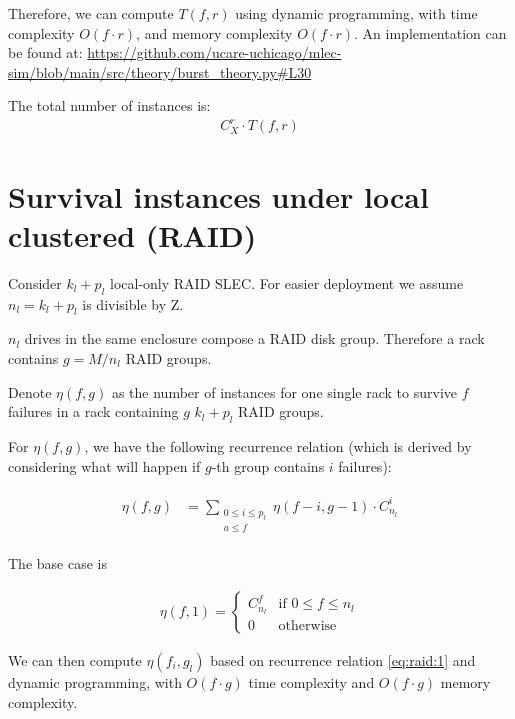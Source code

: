 \documentclass{article}
\begin{document}
Therefore, we can compute $T(f,r)$ using dynamic programming, with time complexity $O(f \cdot r)$, and memory complexity $O(f \cdot r)$. An implementation can be found at: \url{https://github.com/ucare-uchicago/mlec-sim/blob/main/src/theory/burst_theory.py#L30}

The total number of instances is:
\begin{eqnarray}
  C_{X}^{r} \cdot T(f,r)
\label{eq:total:final}
\end{eqnarray}

\section{Survival instances under local clustered (RAID)}\label{sec-raid}

Consider $k_l+p_l$ local-only RAID SLEC. For easier deployment we assume $n_l=k_l+p_l$ is divisible by Z.

$n_l$ drives in the same enclosure compose a RAID disk group. Therefore a rack contains $g = M/n_l$ RAID groups.

Denote $\eta(f, g)$ as the number of instances for one single rack to survive $f$ failures in a rack containing $g$ $k_l+p_l$ RAID groups.

For $\eta(f, g)$, we have the following recurrence relation (which is derived by considering what will happen if $g$-th group contains $i$ failures):

\begin{eqnarray}
\begin{aligned}
  \eta(f, g) &= \sum_{\substack{0 \leq i \leq p_l \\ a\leq f}} \eta(f-i, g-1) \cdot C_{n_l}^i
\end{aligned}
\label{eq:raid:1}
\end{eqnarray}

The base case is 

\begin{eqnarray}
  \eta(f, 1) =
    \begin{cases}
      C_{n_l}^f& \text{if $0 \leq f \leq n_l$}\\
      0 & \text{otherwise}
    \end{cases}       
\label{eq:raid:2}
\end{eqnarray}

We can then compute $\eta(f_i, g_l)$ based on recurrence relation \ref{eq:raid:1} and dynamic programming, with $O(f \cdot g)$ time complexity and $O(f \cdot g)$ memory complexity.\\
\end{document}
